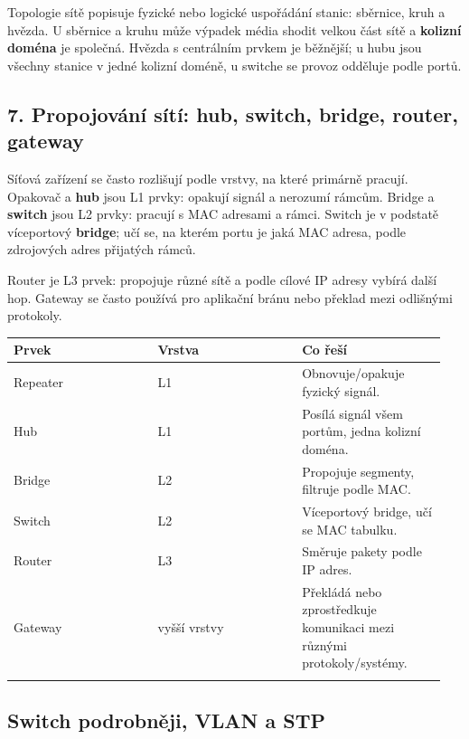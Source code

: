 Topologie sítě popisuje fyzické nebo logické uspořádání stanic: sběrnice, kruh a hvězda. U sběrnice a kruhu může výpadek média shodit velkou část sítě a \textbf{kolizní doména} je společná. Hvězda s centrálním prvkem je běžnější; u hubu jsou všechny stanice v jedné kolizní doméně, u switche se provoz odděluje podle portů.

\subsection*{7. Propojování sítí: hub, switch, bridge, router, gateway}

Síťová zařízení se často rozlišují podle vrstvy, na které primárně pracují. Opakovač a \textbf{hub} jsou L1 prvky: opakují signál a nerozumí rámcům. Bridge a \textbf{switch} jsou L2 prvky: pracují s MAC adresami a rámci. Switch je v podstatě víceportový \textbf{bridge}; učí se, na kterém portu je jaká MAC adresa, podle zdrojových adres přijatých rámců.

Router je L3 prvek: propojuje různé sítě a podle cílové IP adresy vybírá další hop. Gateway se často používá pro aplikační bránu nebo překlad mezi odlišnými protokoly.

\begin{longtable}{p{0.317\linewidth}p{0.317\linewidth}p{0.317\linewidth}}
\toprule
\textbf{Prvek} & \textbf{Vrstva} & \textbf{Co řeší} \\
\midrule\endhead
Repeater & L1 & Obnovuje/opakuje fyzický signál. \\
\addlinespace
Hub & L1 & Posílá signál všem portům, jedna kolizní doména. \\
\addlinespace
Bridge & L2 & Propojuje segmenty, filtruje podle MAC. \\
\addlinespace
Switch & L2 & Víceportový bridge, učí se MAC tabulku. \\
\addlinespace
Router & L3 & Směruje pakety podle IP adres. \\
\addlinespace
Gateway & vyšší vrstvy & Překládá nebo zprostředkuje komunikaci mezi různými protokoly/systémy. \\
\addlinespace
\bottomrule
\end{longtable}


\subsection*{Switch podrobněji, VLAN a STP}

